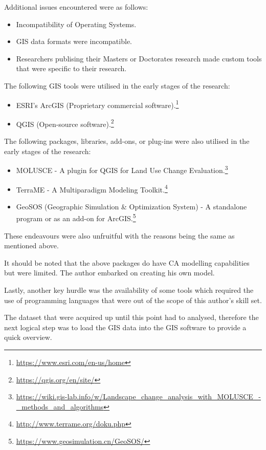 Additional issues encountered were as follows:
\begin{itemize}
\item Incompatibility of Operating Systems.
\item GIS data formats were incompatible.
\item Researchers publising their Masters or Doctorates research made custom tools that were specific to their research.
\end{itemize}
The following GIS tools were utilised in the early stages of the research:
\begin{itemize}
\item ESRI's ArcGIS (Proprietary commercial software).\footnote{\url{https://www.esri.com/en-us/home}}
\item QGIS (Open-source software).\footnote{\url{https://qgis.org/en/site/}}
\end{itemize}

The following packages, libraries, add-ons, or plug-ins were also utilised in the early stages of the research:
\begin{itemize}
\item MOLUSCE - A plugin for QGIS for Land Use Change Evaluation.\footnote{\url{https://wiki.gis-lab.info/w/Landscape_change_analysis_with_MOLUSCE_-_methods_and_algorithms}}
\item TerraME - A Multiparadigm Modeling Toolkit.\footnote{\url{http://www.terrame.org/doku.php}}
\item GeoSOS (Geographic Simulation \& Optimization System) - A standalone program or as an add-on for ArcGIS.\footnote{\url{https://www.geosimulation.cn/GeoSOS/}}
\end{itemize}
These endeavours were also unfruitful with the reasons being the same as mentioned above.

It should be noted that the above packages do have CA modelling capabilities but were limited. The author embarked on creating his own model.

Lastly, another key hurdle was the availability of some tools which required the use of programming languages that were out of the scope of this author's skill set.

The dataset that were acquired up until this point had to analysed, therefore the next logical step was to load the GIS data into the GIS software to provide a quick overview.
